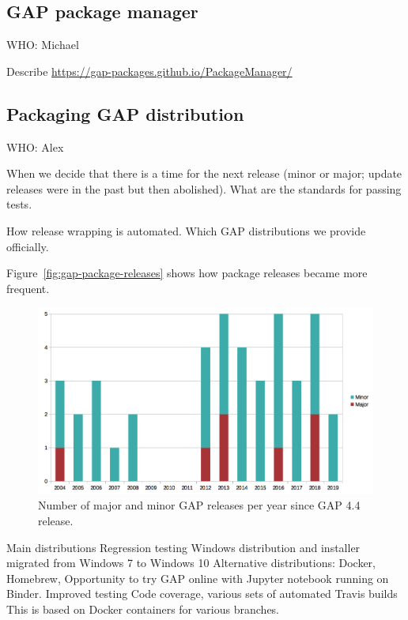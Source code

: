 \documentclass{deliverablereport}
\begin{document}
\subsection{GAP package manager}\label{pkg-manager}

WHO: Michael

Describe \url{https://gap-packages.github.io/PackageManager/}

\subsection{Packaging GAP distribution}\label{distro}

WHO: Alex

When we decide that there is a time for the next release
(minor or major; update releases were in the past but then abolished).
What are the standards for passing tests. 

How release wrapping is automated.
Which GAP distributions we provide officially.

Figure~\ref{fig:gap-package-releases} shows how package releases became more frequent.

\begin{figure}[!ht]
    \centering
    \includegraphics[width=\textwidth]{images/gap-releases}
    \caption{Number of major and minor GAP releases per year since GAP 4.4 release.}
    \label{fig:gap-releases}
\end{figure}

Main distributions
Regression testing
Windows distribution and installer migrated from Windows 7 to Windows 10
Alternative distributions: Docker, Homebrew, 
Opportunity to try GAP online with Jupyter notebook running on Binder.
Improved testing
Code coverage, various sets of automated Travis builds
This is based on Docker containers for various branches.
\end{document}

